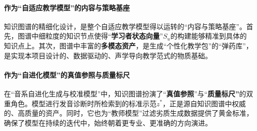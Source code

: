 \paragraph{作为“自适应教学模型”的内容与策略基座}
知识图谱的精细化设计，是整个自适应教学模型得以运转的“内容与策略基座”。首先，图谱中细粒度的知识节点使得“\textbf{学习者状态向量}”$S_u$的构建能够精准到具体的知识点上。其次，图谱中丰富的\textbf{多模态资产}，是生成“个性化教学包”的“弹药库”，是实现本项目设计的、数据驱动的、声学导向教学范式的物质基础。

\paragraph{作为“自进化模型”的真值参照与质量标尺}
在“音系自进化生成与校准模型”中，知识图谱扮演了“\textbf{真值参照}”与“\textbf{质量标尺”}的双重角色。模型进行发音诊断时所检索到的标准示范$z^*$，正是源自知识图谱中权威的、高质量的资产。同时，它也为“教师模型”过滤劣质生成数据提供了黄金标准，确保了模型在持续的迭代中，始终朝着更专业、更准确的方向演进。
